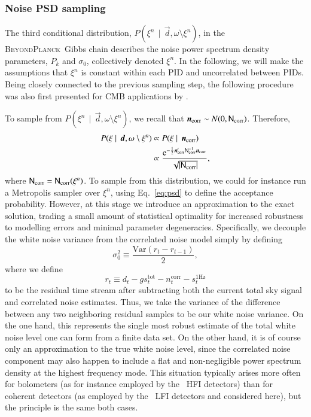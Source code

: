 \documentclass[twocolumn]{aa}
\renewcommand{\d}[0]{\vec{d}}
\newcommand{\n}[0]{\vec{n}}
\newcommand{\N}[0]{\tens{N}}
\newcommand{\BP}{\textsc{BeyondPlanck}}
\newcommand{\e}{\mathrm e}
\begin{document}
\subsubsection{Noise PSD sampling}
\label{sec:ncorr_psd}

The third conditional distribution, $P(\xi^{n}\,\mid \,\d,
\omega\setminus \xi^{n})$, in the \BP\ Gibbs chain describes the noise
power spectrum density parameters, $P_k$ and $\sigma_0$, collectively
denoted $\xi^{n}$. In the following, we will make the assumptions that
$\xi^n$ is constant within each PID and uncorrelated between PIDs.
Being closely connected to the previous sampling step, the following
procedure was also first presented for CMB applications by
\citet{wehus:2012}.

To sample from $P(\xi^{n}\,\mid \,\d, \omega\setminus \xi^{n})$, we
recall that $\n_{\mathrm{corr}}\sim
N(0,\N_{\mathrm{corr}})$. Therefore,
\begin{align}
  P(\xi\mid \,\d, \omega\setminus \xi^{n}) &\propto P(\xi\mid \,\n_{\mathrm{corr}}) \\
  &\propto \frac{\e^{-\frac{1}{2}\n_{\mathrm{corr}}^t\N_{\mathrm{corr}}^{-1}\n_{\mathrm{corr}}}}{\sqrt{|\N_{\mathrm{corr}}|}},
  \label{eq:psd}
\end{align}
where $\N_{\mathrm{corr}}=\N_{\mathrm{corr}}(\xi^n)$. To sample from
this distribution, we could for instance run a Metropolis sampler over
$\xi^n$, using Eq.~\eqref{eq:psd} to define the acceptance
probability.  However, at this stage we introduce an approximation to
the exact solution, trading a small amount of statistical optimality
for increased robustness to modelling errors and minimal parameter
degeneracies. Specifically, we decouple the white noise variance from
the correlated noise model simply by defining
\begin{equation}
\sigma_0^2 \equiv \frac{\mathrm{Var}(r_{t}-r_{t-1})}{2},
\end{equation}
where we define
\begin{equation}
r_t \equiv d_t - g s_t^{\mathrm{tot}} - n_t^{\mathrm{corr}} - s^{\mathrm{1Hz}}_t
\end{equation}
to be the residual time stream after subtracting both the current
total sky signal and correlated noise estimates. Thus, we take the
variance of the difference between any two neighboring residual
samples to be our white noise variance. On the one hand, this
represents the single most robust estimate of the total white noise
level one can form from a finite data set. On the other hand, it is of
course only an approximation to the true white noise level, since the
correlated noise component may also happen to include a flat and
non-negligible power spectrum density at the highest frequency
mode. This situation typically arises more often for bolometers (as
for instance employed by the \Planck\ HFI detectors) than for coherent
detectors (as employed by the \Planck\ LFI detectors and considered
here), but the principle is the same both cases.
\end{document}
